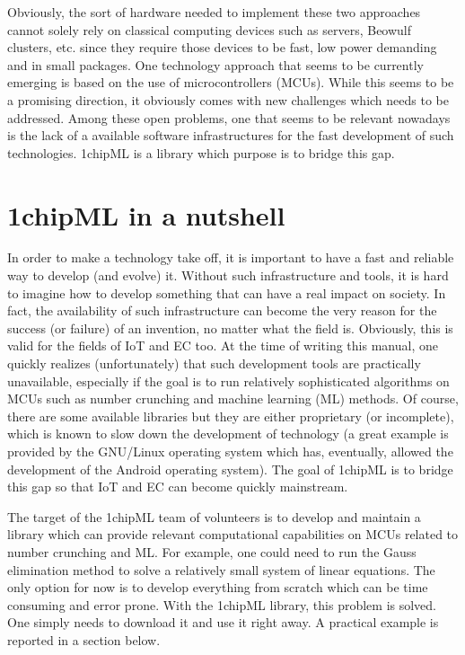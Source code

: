 \documentclass{book}
\begin{document}
Obviously, the sort of hardware needed to implement these two approaches cannot solely    rely on
classical computing devices such as servers, Beowulf clusters, etc.      since they require those
devices to be fast, low power demanding and in small packages. One technology approach that seems
to be currently emerging is based on the use of microcontrollers (MCUs). While this seems to be a
promising direction, it obviously comes with new challenges which needs to be addressed.    Among
these open problems, one that seems to be relevant nowadays   is the lack of a available software
infrastructures for the fast development of such technologies. 1chipML is a library which purpose
is to bridge this gap.

\section{1chipML in a nutshell}

In order to make a technology take off,        it is important to have a fast and reliable way to
develop (and evolve) it.      Without such infrastructure and tools, it is hard to imagine how to
develop something that can have a real impact on society.       In fact, the availability of such
infrastructure can become the very reason for the success (or failure) of an invention, no matter
what the field is. Obviously, this is valid for the fields of IoT and EC too.      At the time of
writing this manual, one quickly realizes (unfortunately) that such development         tools are
practically unavailable, especially if the goal is to run relatively sophisticated  algorithms on
MCUs such as number crunching and machine learning (ML) methods.        Of course, there are some
available libraries but they are either proprietary (or incomplete),  which is known to slow down
the development of technology      (a great example is provided by the GNU/Linux operating system
which has, eventually, allowed the development of the Android operating system).      The goal of
1chipML is to bridge this gap so that IoT and EC can become quickly mainstream.

The target of the 1chipML team of volunteers is to develop and maintain a library       which can
provide relevant computational capabilities on MCUs related to number crunching and ML.       For
example, one could need to run the Gauss elimination method to solve a relatively small system of
linear equations. The only option for now is to develop everything from scratch which can be time
consuming and error prone. With the 1chipML library, this problem is solved.  One simply needs to
download it and use it right away. A practical example is reported in a section below.
\end{document}
